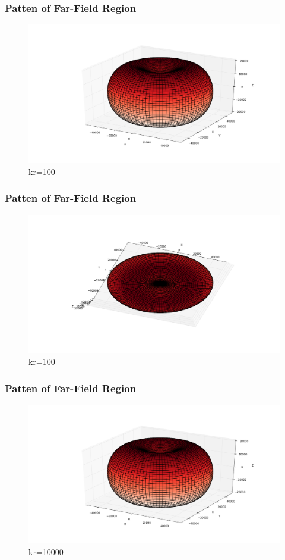 \documentclass[compress=true]{beamer}
\begin{document}
\begin{frame}
  \frametitle{Patten of Far-Field Region}
  \begin{figure}
    \includegraphics[height=0.7\textheight]{far_kr_100_1.png}
    \caption*{\tiny{kr=100}}
  \end{figure}
\end{frame}
\begin{frame}
  \frametitle{Patten of Far-Field Region}
  \begin{figure}
    \includegraphics[height=0.7\textheight]{far_kr_100_2.png}
    \caption*{\tiny{kr=100}}
  \end{figure}
\end{frame}
\begin{frame}
  \frametitle{Patten of Far-Field Region}
  \begin{figure}
    \includegraphics[height=0.7\textheight]{far_kr_10000_1.png}
    \caption*{\tiny{kr=10000}}
  \end{figure}
\end{frame}
\end{document}
